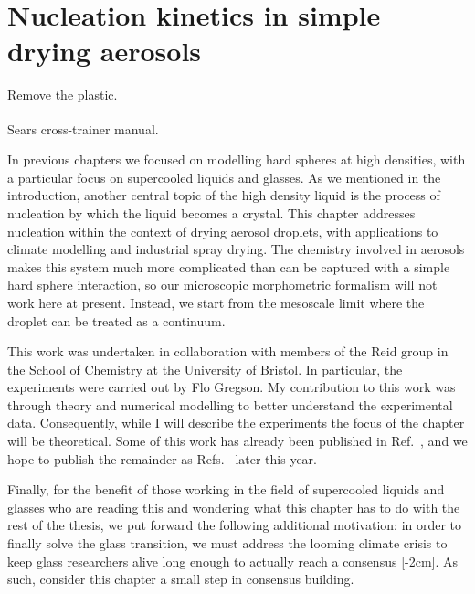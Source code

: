 \documentclass[11pt,twoside]{report}
\begin{document}
\chapter{Nucleation kinetics in simple drying aerosols}
\epigraph{Remove the plastic.}{Sears\textsuperscript{\textregistered} cross-trainer manual.}
\label{chapter:aerosols}

In previous chapters we focused on modelling hard spheres at high densities, with a particular focus on supercooled liquids and glasses.
As we mentioned in the introduction, another central topic of the high density liquid is the process of nucleation by which the liquid becomes a crystal.
This chapter addresses nucleation within the context of drying aerosol droplets, with applications to climate modelling and industrial spray drying.
The chemistry involved in aerosols makes this system much more complicated than can be captured with a simple hard sphere interaction, so our microscopic morphometric formalism will not work here at present.
Instead, we start from the mesoscale limit where the droplet can be treated as a continuum.

This work was undertaken in collaboration with members of the Reid group in the School of Chemistry at the University of Bristol.
In particular, the experiments were carried out by Flo Gregson.
My contribution to this work was through theory and numerical modelling to better understand the experimental data.
Consequently, while I will describe the experiments the focus of the chapter will be theoretical.
Some of this work has already been published in Ref.\ \cite{GregsonJPCB2019}, and we hope to publish the remainder as Refs.\ \cite{RobinsonTBD2019,GregsonTBD2019} later this year.

Finally, for the benefit of those working in the field of supercooled liquids and glasses who are reading this and wondering what this chapter has to do with the rest of the thesis, we put forward the following additional motivation: in order to finally solve the glass transition, we must address the looming climate crisis to keep glass researchers alive long enough to actually reach a consensus%
[-2cm].
As such, consider this chapter a small step in consensus building.
\end{document}
